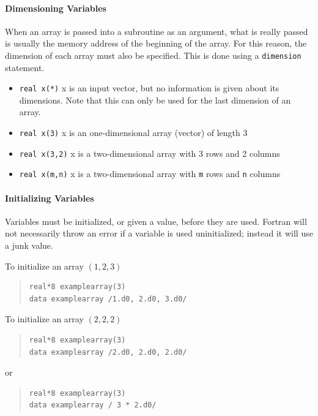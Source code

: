 \documentclass[10pt,letterpaper,oneside]{report}
\begin{document}
\begin{itemize}
\paragraph{Dimensioning Variables}
When an array is passed into a subroutine as an argument, what is really passed is usually the memory address of the beginning of the array.  For this reason, the dimension of each array must also be specified.  This is done using a \texttt{dimension} statement.
\begin{itemize}
\item \texttt{real x(*)} x is an input vector, but no information is given about its dimensions.  Note that this can only be used for the last dimension of an array.
\item \texttt{real x(3)} x is an one-dimensional array (vector) of length 3
\item \texttt{real x(3,2)} x is a two-dimensional array with 3 rows and 2 columns
\item \texttt{real x(m,n)} x is a two-dimensional array with \texttt{m} rows and \texttt{n} columns 
\end{itemize}

\paragraph{Initializing Variables}
Variables must be initialized, or given a value, before they are used.  Fortran will not necessarily throw an error if a variable is used uninitialized; instead it will use a junk value.  

To initialize an array $(1,2,3)$ 
\begin{quote}\begin{lstlisting}
real*8 examplearray(3)
data examplearray /1.d0, 2.d0, 3.d0/
\end{lstlisting}\end{quote}

To initialize an array $(2,2,2)$
\begin{quote}\begin{lstlisting}
real*8 examplearray(3)
data examplearray /2.d0, 2.d0, 2.d0/
\end{lstlisting}\end{quote}
or
\begin{quote}\begin{lstlisting}
real*8 examplearray(3)
data examplearray / 3 * 2.d0/
\end{lstlisting}\end{quote}


\end{itemize}
\end{document}
